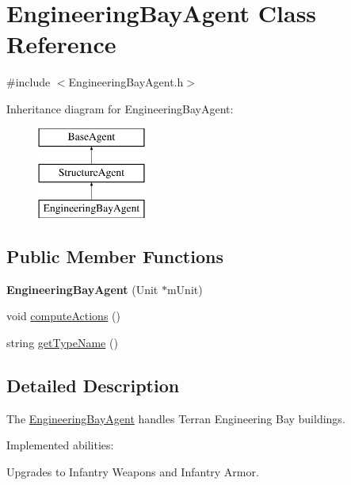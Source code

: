 \hypertarget{class_engineering_bay_agent}{
\section{EngineeringBayAgent Class Reference}
\label{class_engineering_bay_agent}
}


{\ttfamily \#include $<$EngineeringBayAgent.h$>$}

Inheritance diagram for EngineeringBayAgent:\begin{figure}[H]
\begin{center}
\leavevmode
\includegraphics[height=3.000000cm]{class_engineering_bay_agent}
\end{center}
\end{figure}
\subsection*{Public Member Functions}
\begin{DoxyCompactItemize}
\item 
\hypertarget{class_engineering_bay_agent_a1ac1a1ccac9d86950c94a002e06f3d07}{
{\bfseries EngineeringBayAgent} (Unit $\ast$mUnit)}
\label{class_engineering_bay_agent_a1ac1a1ccac9d86950c94a002e06f3d07}

\item 
void \hyperlink{class_engineering_bay_agent_a9cece3163d91d95127fb810c6d12c310}{computeActions} ()
\item 
string \hyperlink{class_engineering_bay_agent_a3fd2773a04bb5920f729fa25cf79817f}{getTypeName} ()
\end{DoxyCompactItemize}


\subsection{Detailed Description}
The \hyperlink{class_engineering_bay_agent}{EngineeringBayAgent} handles Terran Engineering Bay buildings.

Implemented abilities:
\begin{DoxyItemize}
\item Upgrades to Infantry Weapons and Infantry Armor.
\end{DoxyItemize}


